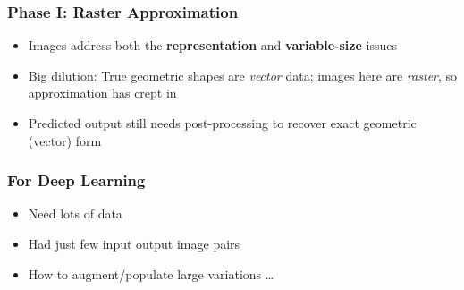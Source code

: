 \begin{frame}[fragile]\frametitle{Phase I: Raster Approximation}

	\begin{itemize}
	\item Images address both the \textbf{representation} and \textbf{variable-size} issues
	\item \alert{Big dilution}: True geometric shapes are \textit{vector} data; images here are \textit{raster}, so approximation has crept in
	\item Predicted output still needs post-processing to recover exact geometric (vector) form
	\end{itemize}

\end{frame}



\begin{frame}[fragile]\frametitle{For Deep Learning}
	\begin{itemize}
	\item Need lots of data
	\item Had just few input output image pairs
	\item How to augment/populate large variations \ldots
	\end{itemize}
\end{frame}



